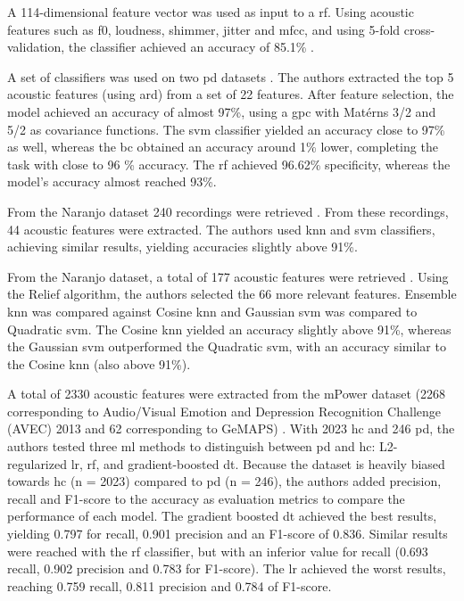 A 114-dimensional feature vector was used as input to a \gls{rf}. Using acoustic features such as \gls{f0}, loudness, shimmer, jitter and \gls{mfcc}, and using 5-fold cross-validation, the classifier achieved an accuracy of 85.1\% \cite{parkinson_acoustic_pompilli}. 

A set of classifiers was used on two \gls{pd} datasets \cite{parkinson_acoustic_despotovic}. The authors extracted the top 5 acoustic features (using \gls{ard}) from a set of 22 features. After feature selection, the model achieved an accuracy of almost 97\%, using a \gls{gpc} with Matérns 3/2 and 5/2 as covariance functions. The \gls{svm} classifier yielded an accuracy close to 97\% as well, whereas the \gls{bc} obtained an accuracy around 1\% lower, completing the task with close to 96 \% accuracy. The \gls{rf} achieved 96.62\% specificity, whereas the model's accuracy almost reached 93\%.

From the Naranjo dataset \cite{naranjo_dataset} 240 recordings were retrieved \cite{parkinson_acoustic_yaman}. From these recordings, 44 acoustic features were extracted. The authors used \gls{knn} and \gls{svm} classifiers, achieving similar results, yielding accuracies slightly above 91\%.

From the Naranjo dataset, a total of 177 acoustic features were retrieved \cite{parkinson_acoustic_yaman}. Using the Relief algorithm, the authors selected the 66 more relevant features. Ensemble \gls{knn} was compared against Cosine \gls{knn} and Gaussian \gls{svm} was compared to Quadratic \gls{svm}. The Cosine \gls{knn} yielded an accuracy slightly above 91\%, whereas the Gaussian \gls{svm} outperformed the Quadratic \gls{svm}, with an accuracy similar to the Cosine \gls{knn} (also above 91\%).

A total of 2330 acoustic features were extracted from the mPower dataset \cite{mPower} (2268 corresponding to Audio/Visual Emotion and Depression Recognition Challenge (AVEC) 2013 and 62 corresponding to GeMAPS) \cite{parkinson_acoustic_tracy}. With 2023 \gls{hc} and 246 \gls{pd}, the authors tested three \gls{ml} methods to distinguish between \gls{pd} and \gls{hc}: L2-regularized \gls{lr}, \gls{rf}, and gradient-boosted \gls{dt}. Because the dataset is heavily biased towards \gls{hc} (n = 2023) compared to \gls{pd} (n = 246), the authors added precision, recall and F1-score to the accuracy as evaluation metrics to compare the performance of each model. The gradient boosted \gls{dt} achieved the best results, yielding 0.797 for recall, 0.901 precision and an F1-score of 0.836. Similar results were reached with the \gls{rf} classifier, but with an inferior value for recall (0.693 recall, 0.902 precision and 0.783 for F1-score). The \gls{lr} achieved the worst results, reaching 0.759 recall, 0.811 precision and 0.784 of F1-score.

